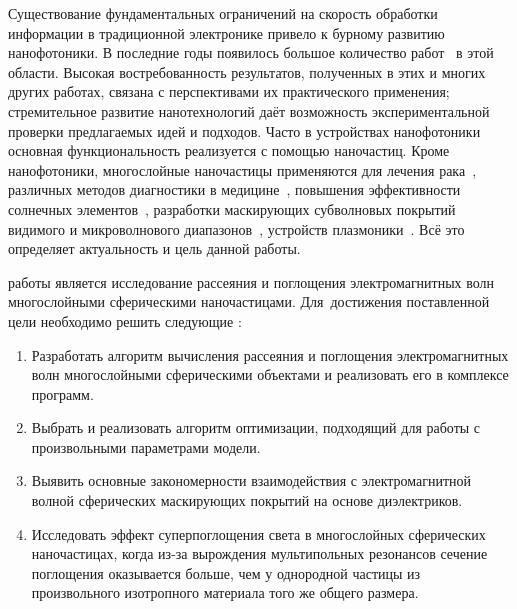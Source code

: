 {\actuality} Существование фундаментальных ограничений на скорость
обработки информации в традиционной электронике привело к бурному
развитию нанофотоники. В последние годы появилось большое количество
работ~\cite{Tame-quantum-plasmonics-2013,
  Javier-graphene-plasmonics-2014, Khurgin-loss-plasmonics-2015,
  He-tunable-terahertz-graphene-metamaterials-2015,
  Segal-meta-nonlinar-PhC-2015,
  Poddubny-hyperbolic-metamaterials-2013, Kildishev-metasurface-2013}
в этой области.  Высокая востребованность результатов, полученных в
этих и многих других работах, связана с перспективами их практического
применения; стремительное развитие нанотехнологий даёт возможность
экспериментальной проверки предлагаемых идей и подходов. Часто в
устройствах нанофотоники основная функциональность реализуется с
помощью наночастиц. Кроме нанофотоники, многослойные наночастицы применяются
для лечения рака~\cite{Zhang-2010, Hirsch-2003}, различных методов
диагностики в медицине~\cite{Allain-2002}, повышения эффективности
солнечных элементов~\cite{Kameya-2011, Mann-2011}, разработки
маскирующих субволновых покрытий видимого и микроволнового
диапазонов~\cite{Qui-2009, Semouchkina-2013}, устройств
плазмоники~\cite{Martin-2013, Alu-2005}.  Всё это определяет
актуальность и цель данной работы.

{\aim} работы является %
исследование рассеяния и поглощения электромагнитных волн многослойными
сферическими наночастицами.
Для~достижения поставленной цели необходимо решить следующие {\tasks}:
\begin{enumerate}
  \item Разработать алгоритм вычисления рассеяния и поглощения
    электромагнитных волн
    многослойными сферическими объектами и реализовать его в комплексе программ.
  \item Выбрать и реализовать алгоритм оптимизации, подходящий для
    работы с произвольными параметрами модели.%
  \item Выявить основные закономерности взаимодействия с
    электромагнитной волной сферических маскирующих покрытий на
    основе диэлектриков.
  \item Исследовать эффект суперпоглощения света в многослойных
    сферических наночастицах, когда из-за вырождения мультипольных
    резонансов сечение поглощения оказывается больше, чем у однородной
    частицы из произвольного изотропного материала того же общего
    размера.
\end{enumerate}

